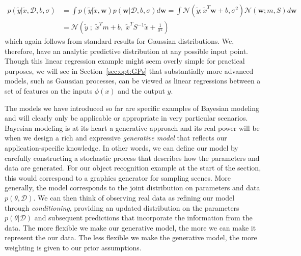 \begin{align}
p(\tilde{y}| \tilde{x},\mathcal{D}, b,\sigma) &= \int p(\tilde{y}| \tilde{x},\mathbf{w}) 
p(\mathbf{w}| \mathcal{D}, b,\sigma) d\mathbf{w} 
= \int \mathcal{N}(\tilde{y};\tilde{x}^T\mathbf{w}+b,\sigma^2)
\mathcal{N}\left(\mathbf{w} ; m, S\right) d\mathbf{w} \nonumber \\
&= \mathcal{N} \left(\tilde{y} \; ; \;\tilde{x}^Tm+b, \; \tilde{x}^T S^{-1}\tilde{x}+\frac{1}{\sigma^2} \right)
\end{align}
which again follows from standard results for Gaussian distributions.  We, therefore, have
an analytic predictive distribution at any possible input point.
Though this linear regression example might seem overly simple for practical purposes, we
will see in Section~\ref{sec:opt:GPs} that substantially more advanced models, such as
Gaussian processes, can be viewed as linear regressions between a set of features on the inputs $\phi(x)$
and the output $y$.

The models we have introduced so far are specific examples of Bayesian modeling and will
clearly only be applicable or appropriate in very particular scenarios.  
Bayesian modeling is at its heart a
generative approach and its real power will be when we design a rich and expressive \emph{generative model} 
that reflects our application-specific knowledge.  In other words, we can define our model
by carefully constructing a stochastic process that describes how the parameters  and data are generated.  For
our object recognition example at the start of the section, this would correspond to a graphics generator for
sampling scenes.
More generally, the model corresponds to the joint distribution on parameters and data $p(\theta,\mathcal{D})$.
We can then think of observing real data as refining our model through \emph{conditioning}, providing an updated distribution
on the parameters $p(\theta|\mathcal{D})$ and subsequent predictions that incorporate the information from the data.  The more
flexible we make our generative model, the more we can make it represent the our data.  The less flexible
we make the generative model, the more weighting is given to our prior assumptions.


